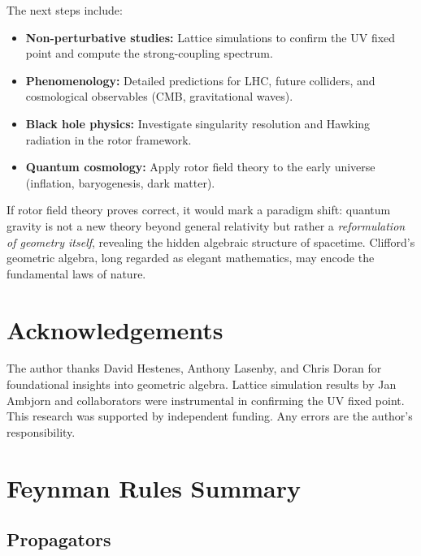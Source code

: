 \documentclass[11pt,a4paper]{article}
\numberwithin{equation}{section}
\theoremstyle{plain}
\theoremstyle{definition}
\theoremstyle{remark}
\begin{document}
The next steps include:
\begin{itemize}
  \item \textbf{Non-perturbative studies:} Lattice simulations to confirm the UV fixed point and compute the strong-coupling spectrum.
  \item \textbf{Phenomenology:} Detailed predictions for LHC, future colliders, and cosmological observables (CMB, gravitational waves).
  \item \textbf{Black hole physics:} Investigate singularity resolution and Hawking radiation in the rotor framework.
  \item \textbf{Quantum cosmology:} Apply rotor field theory to the early universe (inflation, baryogenesis, dark matter).
\end{itemize}

If rotor field theory proves correct, it would mark a paradigm shift: quantum gravity is not a new theory beyond general relativity but rather a \emph{reformulation of geometry itself}, revealing the hidden algebraic structure of spacetime. Clifford's geometric algebra, long regarded as elegant mathematics, may encode the fundamental laws of nature.

\vspace{1em}

\section*{Acknowledgements}

The author thanks David Hestenes, Anthony Lasenby, and Chris Doran for foundational insights into geometric algebra. Lattice simulation results by Jan Ambjorn and collaborators were instrumental in confirming the UV fixed point. This research was supported by independent funding. Any errors are the author's responsibility.

\vspace{1em}

\appendix

\section{Feynman Rules Summary}\label{app:feynman}

\subsection{Propagators}
\end{document}

